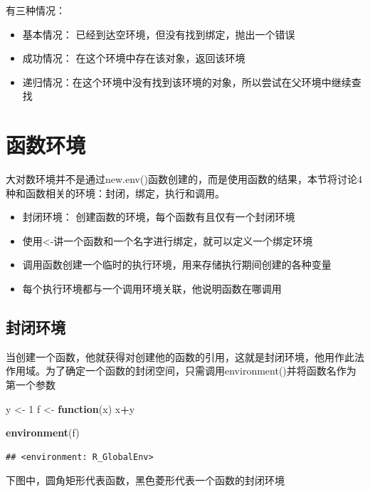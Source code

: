 \documentclass[]{book}
\newenvironment{Shaded}{\begin{snugshade}}{\end{snugshade}}
\newcommand{\KeywordTok}[1]{\textcolor[rgb]{0.13,0.29,0.53}{\textbf{#1}}}
\newcommand{\DecValTok}[1]{\textcolor[rgb]{0.00,0.00,0.81}{#1}}
\newcommand{\StringTok}[1]{\textcolor[rgb]{0.31,0.60,0.02}{#1}}
\newcommand{\ControlFlowTok}[1]{\textcolor[rgb]{0.13,0.29,0.53}{\textbf{#1}}}
\newcommand{\OperatorTok}[1]{\textcolor[rgb]{0.81,0.36,0.00}{\textbf{#1}}}
\newcommand{\NormalTok}[1]{#1}
\begin{document}
有三种情况：

\begin{itemize}
\item
  基本情况： 已经到达空环境，但没有找到绑定，抛出一个错误
\item
  成功情况： 在这个环境中存在该对象，返回该环境
\item
  递归情况：在这个环境中没有找到该环境的对象，所以尝试在父环境中继续查找
\end{itemize}

\section{函数环境}

大对数环境并不是通过new.env()函数创建的，而是使用函数的结果，本节将讨论4种和函数相关的环境：封闭，绑定，执行和调用。

\begin{itemize}
\item
  封闭环境： 创建函数的环境，每个函数有且仅有一个封闭环境
\item
  使用\textless{}-讲一个函数和一个名字进行绑定，就可以定义一个绑定环境
\item
  调用函数创建一个临时的执行环境，用来存储执行期间创建的各种变量
\item
  每个执行环境都与一个调用环境关联，他说明函数在哪调用
\end{itemize}

\subsection{封闭环境}

当创建一个函数，他就获得对创建他的函数的引用，这就是封闭环境，他用作此法作用域。为了确定一个函数的封闭空间，只需调用environment()并将函数名作为第一个参数

\begin{Shaded}
\begin{Highlighting}[]
\NormalTok{y <-}\StringTok{ }\DecValTok{1}
\NormalTok{f <-}\StringTok{ }\ControlFlowTok{function}\NormalTok{(x) x}\OperatorTok{+}\NormalTok{y}

\KeywordTok{environment}\NormalTok{(f)}
\end{Highlighting}
\end{Shaded}

\begin{verbatim}
## <environment: R_GlobalEnv>
\end{verbatim}

下图中，圆角矩形代表函数，黑色菱形代表一个函数的封闭环境
\end{document}
